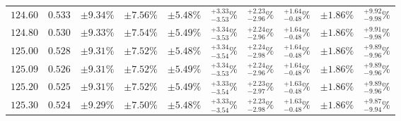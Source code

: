 \begin{table}[ht!]
{{\begin{tabular}{| cc | ccc | cccc | c |}
$124.60$ & $0.533$ & $\pm9.34\%$ & {\color{black!55}$\pm 7.56\%$} & {\color{black!55}$\pm 5.48\%$} & $^{+3.33}_{-3.53}\%$ & {\color{black!55}$^{+2.23}_{-2.96}\%$} & {\color{black!55}$^{+1.64}_{-0.48}\%$} & {\color{black!55}$\pm 1.86\%$} & $^{+9.92}_{-9.98}\%$  \\
$124.80$ & $0.530$ & $\pm9.33\%$ & {\color{black!55}$\pm 7.54\%$} & {\color{black!55}$\pm 5.49\%$} & $^{+3.34}_{-3.53}\%$ & {\color{black!55}$^{+2.24}_{-2.96}\%$} & {\color{black!55}$^{+1.64}_{-0.48}\%$} & {\color{black!55}$\pm 1.86\%$} & $^{+9.91}_{-9.98}\%$  \\
$125.00$ & $0.528$ & $\pm9.31\%$ & {\color{black!55}$\pm 7.52\%$} & {\color{black!55}$\pm 5.48\%$} & $^{+3.34}_{-3.54}\%$ & {\color{black!55}$^{+2.24}_{-2.98}\%$} & {\color{black!55}$^{+1.64}_{-0.48}\%$} & {\color{black!55}$\pm 1.86\%$} & $^{+9.89}_{-9.96}\%$  \\
$125.09$ & $0.526$ & $\pm9.31\%$ & {\color{black!55}$\pm 7.52\%$} & {\color{black!55}$\pm 5.49\%$} & $^{+3.34}_{-3.53}\%$ & {\color{black!55}$^{+2.24}_{-2.96}\%$} & {\color{black!55}$^{+1.64}_{-0.48}\%$} & {\color{black!55}$\pm 1.86\%$} & $^{+9.89}_{-9.96}\%$  \\
$125.20$ & $0.525$ & $\pm9.31\%$ & {\color{black!55}$\pm 7.52\%$} & {\color{black!55}$\pm 5.49\%$} & $^{+3.33}_{-3.54}\%$ & {\color{black!55}$^{+2.23}_{-2.97}\%$} & {\color{black!55}$^{+1.63}_{-0.48}\%$} & {\color{black!55}$\pm 1.86\%$} & $^{+9.89}_{-9.96}\%$  \\
$125.30$ & $0.524$ & $\pm9.29\%$ & {\color{black!55}$\pm 7.50\%$} & {\color{black!55}$\pm 5.48\%$} & $^{+3.33}_{-3.54}\%$ & {\color{black!55}$^{+2.23}_{-2.98}\%$} & {\color{black!55}$^{+1.63}_{-0.48}\%$} & {\color{black!55}$\pm 1.86\%$} & $^{+9.87}_{-9.94}\%$  \\

\end{tabular}}}
\end{table}
